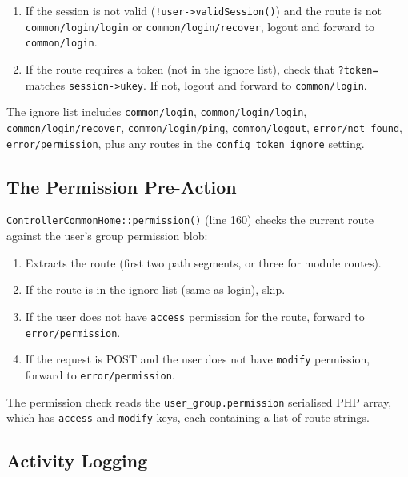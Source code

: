 \documentclass[11pt,a4paper]{article}
\begin{document}
\begin{enumerate}[leftmargin=1.6em,itemsep=2pt]
  \item If the session is not valid (\texttt{!user->validSession()}) and
        the route is not \texttt{common/login/login} or
        \texttt{common/login/recover}, logout and forward to
        \texttt{common/login}.
  \item If the route requires a token (not in the ignore list), check
        that \texttt{?token=} matches \texttt{session->ukey}. If not,
        logout and forward to \texttt{common/login}.
\end{enumerate}

The ignore list includes \texttt{common/login},
\texttt{common/login/login}, \texttt{common/login/recover},
\texttt{common/login/ping}, \texttt{common/logout},
\texttt{error/not\_found}, \texttt{error/permission}, plus any
routes in the \texttt{config\_token\_ignore} setting.

\subsection{The Permission Pre-Action}

\texttt{ControllerCommonHome::permission()} (line 160) checks the
current route against the user's group permission blob:

\begin{enumerate}[leftmargin=1.6em,itemsep=2pt]
  \item Extracts the route (first two path segments, or three for
        module routes).
  \item If the route is in the ignore list (same as login), skip.
  \item If the user does not have \texttt{access} permission for the
        route, forward to \texttt{error/permission}.
  \item If the request is POST and the user does not have
        \texttt{modify} permission, forward to \texttt{error/permission}.
\end{enumerate}

The permission check reads the \texttt{user\_group.permission}
serialised PHP array, which has \texttt{access} and \texttt{modify}
keys, each containing a list of route strings.

\subsection{Activity Logging}
\end{document}
